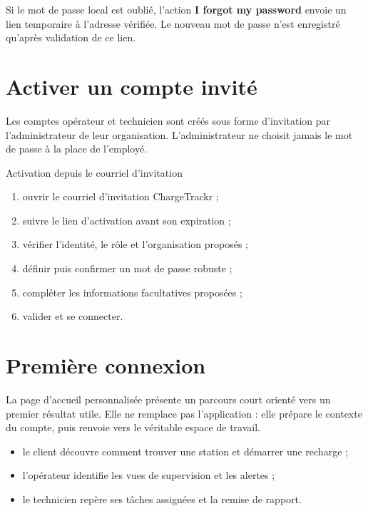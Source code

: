 
Si le mot de passe local est oublié, l'action \textbf{I forgot my password}
envoie un lien temporaire à l'adresse vérifiée. Le nouveau mot de passe n'est
enregistré qu'après validation de ce lien.


\section{Activer un compte invité}

Les comptes opérateur et technicien sont créés sous forme d'invitation par
l'administrateur de leur organisation. L'administrateur ne choisit jamais le mot
de passe à la place de l'employé.

\begin{procedurebox}{Activation depuis le courriel d'invitation}
  \begin{enumerate}[leftmargin=1.6em]
    \item ouvrir le courriel d'invitation ChargeTrackr ;
    \item suivre le lien d'activation avant son expiration ;
    \item vérifier l'identité, le rôle et l'organisation proposés ;
    \item définir puis confirmer un mot de passe robuste ;
    \item compléter les informations facultatives proposées ;
    \item valider et se connecter.
  \end{enumerate}
\end{procedurebox}


\section{Première connexion}

La page d'accueil personnalisée présente un parcours court orienté vers un
premier résultat utile. Elle ne remplace pas l'application : elle prépare le
contexte du compte, puis renvoie vers le véritable espace de travail.

\begin{itemize}[leftmargin=1.6em]
  \item le client découvre comment trouver une station et démarrer une recharge ;
  \item l'opérateur identifie les vues de supervision et les alertes ;
  \item le technicien repère ses tâches assignées et la remise de rapport.
\end{itemize}

